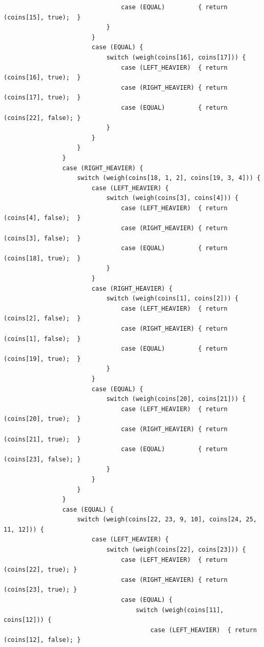 \documentclass[answers]{exam}
\begin{document}
\begin{questions}
\begin{parts}
\begin{solution}
\begin{small}
\begin{verbatim}
                                case (EQUAL)         { return (coins[15], true);  }
                            }
                        }
                        case (EQUAL) {
                            switch (weigh(coins[16], coins[17])) {
                                case (LEFT_HEAVIER)  { return (coins[16], true);  }
                                case (RIGHT_HEAVIER) { return (coins[17], true);  }
                                case (EQUAL)         { return (coins[22], false); }
                            }
                        }
                    }
                }
                case (RIGHT_HEAVIER) {
                    switch (weigh(coins[18, 1, 2], coins[19, 3, 4])) {
                        case (LEFT_HEAVIER) {
                            switch (weigh(coins[3], coins[4])) {
                                case (LEFT_HEAVIER)  { return (coins[4], false);  }
                                case (RIGHT_HEAVIER) { return (coins[3], false);  }
                                case (EQUAL)         { return (coins[18], true);  }
                            }
                        }
                        case (RIGHT_HEAVIER) {
                            switch (weigh(coins[1], coins[2])) {
                                case (LEFT_HEAVIER)  { return (coins[2], false);  }
                                case (RIGHT_HEAVIER) { return (coins[1], false);  }
                                case (EQUAL)         { return (coins[19], true);  }
                            }
                        }
                        case (EQUAL) {
                            switch (weigh(coins[20], coins[21])) {
                                case (LEFT_HEAVIER)  { return (coins[20], true);  }
                                case (RIGHT_HEAVIER) { return (coins[21], true);  }
                                case (EQUAL)         { return (coins[23], false); }
                            }
                        }
                    }
                }
                case (EQUAL) {
                    switch (weigh(coins[22, 23, 9, 10], coins[24, 25, 11, 12])) {
                        case (LEFT_HEAVIER) {
                            switch (weigh(coins[22], coins[23])) {
                                case (LEFT_HEAVIER)  { return (coins[22], true); }
                                case (RIGHT_HEAVIER) { return (coins[23], true); }
                                case (EQUAL) {
                                    switch (weigh(coins[11], coins[12])) {
                                        case (LEFT_HEAVIER)  { return (coins[12], false); }

\end{verbatim}
\end{small}
\end{solution}
\end{parts}
\end{questions}
\end{document}
